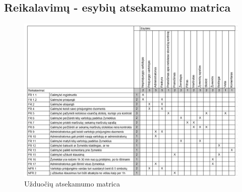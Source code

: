 \documentclass{VUMIFPSkursinis}
\begin{document}
\subsection{Reikalavimų - esybių atsekamumo matrica}
	\begin{figure}[H]
				\centering
				\includegraphics[scale=0.4]{img/uzduociu_matrica}
				\caption{Užduočių atsekamumo matrica}
				\label{img:matrix}
			\end{figure}
\end{document}
